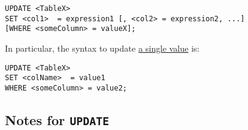 \documentclass{article}
\begin{document}
\begin{lstlisting}[frame=single]  
UPDATE <TableX> 
SET <col1>  = expression1 [, <col2> = expression2, ...]
[WHERE <someColumn> = valueX];
\end{lstlisting} 


  
  
  
\noindent In particular, the syntax to update \underline{a single value}  is: 
\begin{lstlisting}[frame=single]  
UPDATE <TableX> 
SET <colName>  = value1
WHERE <someColumn> = value2;
\end{lstlisting} 


  
 \subsection*{Notes for \texttt{UPDATE}}
\end{document}
